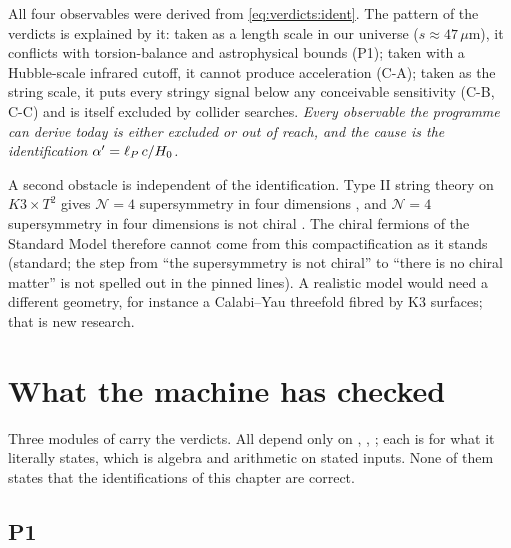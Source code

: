 All four observables were derived from \eqref{eq:verdicts:ident}. The pattern of the verdicts is
explained by it: taken as a length scale in our universe ($s\approx47\,\mu$m), it conflicts with
torsion-balance and astrophysical bounds (P1); taken with a Hubble-scale infrared cutoff, it
cannot produce acceleration (C-A); taken as the string scale, it puts every stringy signal
below any conceivable sensitivity (C-B, C-C) and is itself excluded by collider searches.
\emph{Every observable the programme can derive today is either excluded or out of reach, and
the cause is the identification $\alpha'=\ell_P\,c/H_0$.}

A second obstacle is independent of the identification. Type II string theory on $K3\times T^2$
gives $\mathcal N=4$ supersymmetry in four dimensions , and
$\mathcal N=4$ supersymmetry in four dimensions is not chiral .
The chiral fermions of the Standard Model therefore cannot come from this compactification as it
stands (standard; the step from ``the supersymmetry is not chiral'' to ``there is no chiral
matter'' is not spelled out in the pinned lines). A realistic model would need a different
geometry, for instance a Calabi--Yau threefold fibred by K3 surfaces; that is new research.

\section{What the machine has checked}\label{sec:verdicts:lean}

Three modules of  carry the verdicts. All depend only on
, , ; each is \TA{} for what it literally
states, which is algebra and arithmetic on stated inputs. None of them states that the
identifications of this chapter are correct.

\subsection{P1}

